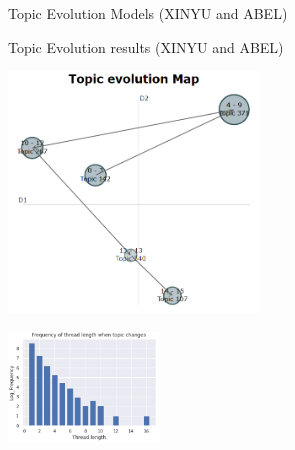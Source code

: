 \documentclass[final]{beamer}
\newlength{\colwidth}
\begin{document}
\begin{frame}[t]
\begin{columns}[t]
\begin{column}{\colwidth}
\begin{block}{Topic Evolution Models (XINYU and ABEL)}
  \end{block}

  \begin{block}{Topic Evolution results (XINYU and ABEL)}

    \begin{multicols}{2}
    \begin{center}
    \includegraphics[width=0.5\textwidth]{bertopic_topic_evol.png}
    \label{evolution}
    \end{center}
    \begin{center}
    \includegraphics[width=0.3\textwidth]{bertopic_topic_change_number.png}
    \label{overall}
    \end{center}

\end{multicols}
\end{block}
\end{column}
\end{columns}
\end{frame}
\end{document}
